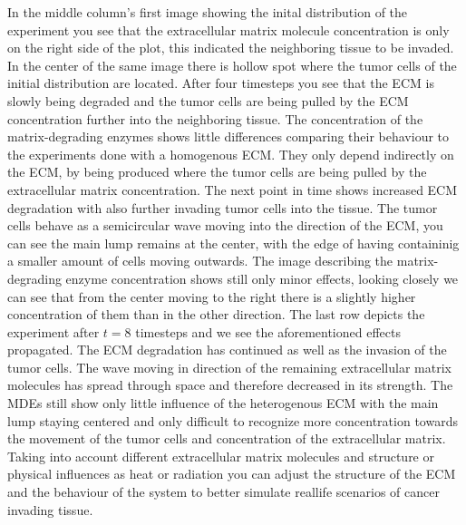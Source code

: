 In the middle column's first image showing the inital distribution of the experiment you see that the extracellular matrix molecule concentration is only on the right side of the plot, this indicated the neighboring tissue to be invaded. In the center of the same image there is hollow spot where the tumor cells of the initial distribution are located. \newline 
After four timesteps you see that the ECM is slowly being degraded and the tumor cells are being pulled by the ECM concentration further into the neighboring tissue. The concentration of the matrix-degrading enzymes shows little differences comparing their behaviour to the experiments done with a homogenous ECM. They only depend indirectly on the ECM, by being produced where the tumor cells are being pulled by the extracellular matrix concentration. \newline
The next point in time shows increased ECM degradation with also further invading tumor cells into the tissue. The tumor cells behave as a semicircular wave moving into the direction of the ECM, you can see the main lump remains at the center, with the edge of having containinig a smaller amount of cells moving outwards. The image describing the matrix-degrading enzyme concentration shows still only minor effects, looking closely we can see that from the center moving to the right there is a slightly higher concentration of them than in the other direction.\newline
The last row depicts the experiment after $t=8$ timesteps and we see the aforementioned effects propagated. The ECM degradation has continued as well as the invasion of the tumor cells. The wave moving in direction of the remaining extracellular matrix molecules has spread through space and therefore decreased in its strength. The MDEs still show only little influence of the heterogenous ECM with the main lump staying centered and only difficult to recognize more concentration towards the movement of the tumor cells and concentration of the extracellular matrix.\newline 
Taking into account different extracellular matrix molecules and structure or physical influences as heat or radiation you can adjust the structure of the ECM and the behaviour of the system to better simulate reallife scenarios of cancer invading tissue.